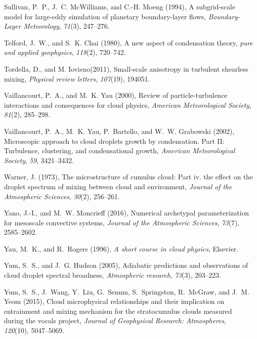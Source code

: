 \documentclass[draft,linenumbers]{agujournal}
\begin{document}
\begin{thebibliography}{60}
Sullivan, P.~P., J.~C. McWilliams, and C.-H. Moeng (1994), A subgrid-scale
  model for large-eddy simulation of planetary boundary-layer flows,
  \textit{Boundary-Layer Meteorology}, \textit{71}(3), 247--276.

Telford, J.~W., and S.~K. Chai (1980), A new aspect of condensation theory,
  \textit{pure and applied geophysics}, \textit{118}(2), 720--742.

Tordella, D., and M. Iovieno(2011), Small-scale anisotropy in turbulent shearless mixing, \textit{Physical review letters}, \textit{107}(19), 194051.
  
Vaillancourt, P.~A., and M.~K. Yau (2000), Review of particle-turbulence
  interactions and consequences for cloud physics, \textit{American
  Meteorological Society}, \textit{81}(2), 285--298.

Vaillancourt, P.~A., M.~K. Yau, P.~Bartello, and W.~W. Grabowski (2002),
  Microscopic approach to cloud droplets growth by condensation. Part II:
  Turbulence, clustering, and condensational growth, \textit{American
  Meteorological Society}, \textit{59}, 3421--3432.

Warner, J. (1973), The microstructure of cumulus cloud: Part iv. the effect on
  the droplet spectrum of mixing between cloud and environment, \textit{Journal
  of the Atmospheric Sciences}, \textit{30}(2), 256--261.

Yano, J.-I., and M.~W. Moncrieff (2016), Numerical archetypal parameterization
  for mesoscale convective systems, \textit{Journal of the Atmospheric
  Sciences}, \textit{73}(7), 2585--2602.

Yau, M.~K., and R.~Rogers (1996), \textit{A short course in cloud physics},
  Elsevier.

Yum, S.~S., and J.~G. Hudson (2005), Adiabatic predictions and observations of
  cloud droplet spectral broadness, \textit{Atmospheric research},
  \textit{73}(3), 203--223.

Yum, S.~S., J.~Wang, Y.~Liu, G.~Senum, S.~Springston, R.~McGraw, and J.~M. Yeom
  (2015), Cloud microphysical relationships and their implication on
  entrainment and mixing mechanism for the stratocumulus clouds measured during
  the vocals project, \textit{Journal of Geophysical Research: Atmospheres},
  \textit{120}(10), 5047--5069.
  
\end{thebibliography}
\end{document}
